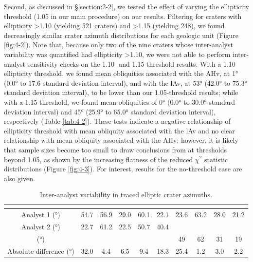 \documentclass{ucetd}
\begin{document}
Second, as discussed in §\ref{section:2-2}, we tested the effect of varying the ellipticity threshold (1.05 in our main procedure) on our results. Filtering for craters with ellipticity >1.10 (yielding 521 craters) and >1.15 (yielding 248), we found decreasingly similar crater azimuth distributions for each geologic unit (Figure \ref{fig:4-2}). Note that, because only two of the nine craters whose inter-analyst variability was quantified had ellipticity >1.10, we were not able to perform inter-analyst sensitivity checks on the 1.10- and 1.15-threshold results. With a 1.10 ellipticity threshold, we found mean obliquities associated with the AHv, at 1° (0.0° to 17.6 standard deviation interval), and with the lAv, at 53° (42.0° to 75.3° standard deviation interval), to be lower than our 1.05-threshold results; while with a 1.15 threshold, we found mean obliquities of 0° (0.0° to 30.0° standard deviation interval) and 45° (25.9° to 65.0° standard deviation interval), respectively (Table \ref{tab:4-2}). These tests indicate a negative relationship of ellipticity threshold with mean obliquity associated with the lAv and no clear relationship with mean obliquity associated with the AHv; however, it is likely that sample sizes become too small to draw conclusions from at thresholds beyond 1.05, as shown by the increasing flatness of the reduced $\chi^2$ statistic distributions (Figure \ref{fig:4-3}). For interest, results for the no-threshold case are also given.

\begin{table}
    \centering
    \caption{Inter-analyst variability in traced elliptic crater azimuths.}
    \label{tab:4-1}
    \bigskip
    \begin{tabular}{
        @{}
        c
        S[table-format=2.1]
        S[table-format=2.1]
        S[table-format=2.1]
        S[table-format=2.1]
        S[table-format=2.1]
        S[table-format=2.1]
        S[table-format=2.1]
        S[table-format=2.1]
        S[table-format=2.1]
        @{}
    }
    \toprule
         &  &  &  &  &  &  &  &  &  \\
    \midrule
        Analyst 1 (°) & 54.7 & 56.9 & 29.0 & 60.1 & 22.1 & 23.6 & 63.2 & 28.0 & 21.2 \\
        Analyst 2 (°) & 22.7 & 61.2 & 22.5 & 50.7 & 40.4 & & & & \\
        \citet{holo2018a} (°) & & & & & & 49 & 62 & 31 & 19 \\
        Absolute difference (°) & 32.0 & 4.4 & 6.5 & 9.4 & 18.3 & 25.4 & 1.2 & 3.0 & 2.2 \\
    \bottomrule
    \end{tabular}
\end{table}
\end{document}
